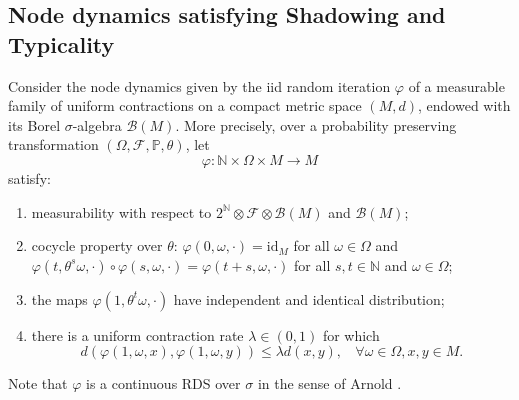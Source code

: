 \documentclass[a4paper]{article}
\theoremstyle{plain}
\theoremstyle{definition}
\newcommand{\PP}{\mathbb{P}}
\newcommand{\R}{\mathbb{R}}
\newcommand{\T}{\mathbb{T}}
\newcommand{\Z}{\mathbb{Z}}
\newcommand{\N}{\mathbb{N}}
\newcommand{\Bil}{\mathcal{B}}
\newcommand{\Eil}{\mathcal{E}}
\newcommand{\Fil}{\mathcal{F}}
\begin{document}
\subsection{Node dynamics satisfying Shadowing and Typicality}
Consider the node dynamics given by the iid random iteration $\varphi$ of a measurable family of uniform contractions on a compact metric space $(M,d)$, endowed with its Borel $\sigma$-algebra $\Bil(M)$. %
More precisely, over a probability preserving transformation $(\Omega,\Fil,\PP,\theta)$, let
\begin{equation}\label{eq:iid_contractions}
	\varphi:\N\times\Omega\times M\to M
\end{equation}
satisfy:
\begin{enumerate}
	\item[(C1)] measurability with respect to $2^{\N}\otimes\Fil\otimes \Bil(M)$ and $\Bil(M)$;
	\item[(C2)] cocycle property over $\theta$: $\varphi(0,\omega,\cdot)=\mathrm{id}_M$ for all $\omega\in\Omega$ and $\varphi(t,\theta^s\omega,\cdot)\circ \varphi(s,\omega,\cdot)= \varphi(t+s,\omega,\cdot)$ for all $s,t\in\N$ and $\omega\in\Omega$;
	\item[(C3)] the maps $\varphi(1,\theta^t\omega,\cdot)$ have independent and identical distribution;
	\item[(C4)] there is a uniform contraction rate $\lambda\in(0,1)$ for which
	$$d(\varphi(1,\omega,x),\varphi(1,\omega,y))\leq \lambda d(x,y),~~~~\forall \omega\in\Omega, x,y\in M.$$
\end{enumerate}



Note that $\varphi$ is a continuous RDS over $\sigma$ in the sense of Arnold \cite{Arnold1998}.
\end{document}
